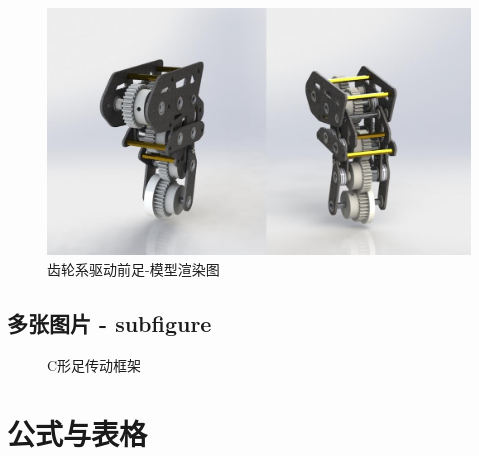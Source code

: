\documentclass[12pt]{article}
\begin{document}
\begin{CJK}{UTF8}{gbsn}
\begin{figure}[H]
\centering
\includegraphics[width=.8\textwidth]{chap2//figa.jpg}
\caption{齿轮系驱动前足-模型渲染图}
\end{figure}

\subsection{多张图片 - subfigure}

\begin{figure}[H]
{}
\quad
{}
\quad
\caption{C形足传动框架}
\end{figure}
\newpage
\section{公式与表格}

\end{CJK}
\end{document}
